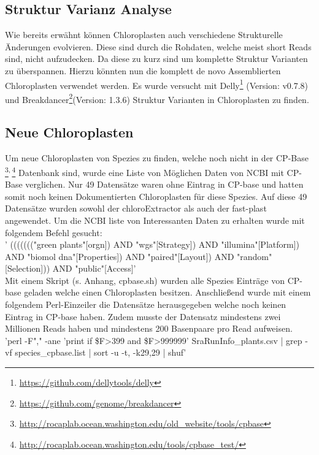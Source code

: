 \documentclass{scrartcl}
\begin{document}
\subsection{Struktur Varianz Analyse}
\label{sec-3-5}
Wie bereits erwähnt können Chloroplasten auch verschiedene Strukturelle Änderungen evolvieren. Diese sind durch die Rohdaten, welche meist short Reads sind, nicht aufzudecken.
Da diese zu kurz sind um komplette Struktur Varianten zu überspannen.\footnotemark[7]{} Hierzu könnten nun die komplett de novo Assemblierten Chloroplasten verwendet werden.
Es wurde versucht mit Delly\footnote{\url{https://github.com/dellytools/delly}} (Version: v0.7.8) und Breakdancer\footnote{\url{https://github.com/genome/breakdancer}

\clearpage}(Version: 1.3.6) Struktur Varianten in Chloroplasten zu finden.  

\subsection{Neue Chloroplasten}
\label{sec-3-6}
Um neue Chloroplasten von Spezies zu finden, welche noch nicht in der CP-Base \footnote{\url{http://rocaplab.ocean.washington.edu/old_website/tools/cpbase}}\textsuperscript{,}\,\footnote{\url{http://rocaplab.ocean.washington.edu/tools/cpbase_test/}} Datenbank sind, wurde eine Liste von Möglichen Daten von NCBI mit CP-Base verglichen. Nur 49 Datensätze waren ohne 
Eintrag in CP-base und hatten somit noch keinen Dokumentierten Chloroplasten für diese Spezies. Auf diese 49 Datensätze wurden sowohl der chloroExtractor als auch der fast-plast angewendet. 
Um die NCBI liste von Interessanten Daten zu erhalten wurde mit folgendem Befehl gesucht:
\\
' ((((((("green plants"[orgn]) AND "wgs"[Strategy]) AND "illumina"[Platform]) AND "biomol dna"[Properties]) AND "paired"[Layout]) AND "random"[Selection])) AND "public"[Access]'
\\
Mit einem Skript (s. Anhang, cpbase.sh) wurden alle Spezies Einträge von CP-base geladen welche einen Chloroplasten besitzen. Anschließend wurde mit einem folgendem Perl-Einzeiler
die Datensätze herausgegeben welche noch keinen Eintrag in CP-base haben. Zudem musste der Datensatz mindestens zwei Millionen Reads haben und mindestens 200 Basenpaare pro Read
aufweisen.
\\
'perl -F"," -ane 'print if \$F\footnotemark[44]{}>399 and \$F\footnotemark[8]{}>999999' SraRunInfo\_plants.csv | grep -vf species\_cpbase.list | sort -u -t, -k29,29 | shuf'
\end{document}
